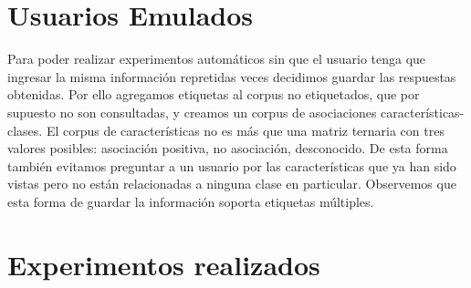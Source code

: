 \section{Usuarios Emulados}

Para poder realizar experimentos automáticos sin que el usuario tenga que ingresar la misma información repretidas veces decidimos guardar las respuestas obtenidas. Por ello agregamos etiquetas al corpus no etiquetados, que por supuesto no son consultadas, y creamos un corpus de asociaciones características-clases.
El corpus de características no es más que una matriz ternaria con tres valores posibles: asociación positiva, no asociación, desconocido. De esta forma también evitamos preguntar a un usuario por las características que ya han sido vistas pero no están relacionadas a ninguna clase en particular. Observemos que esta forma de guardar la información soporta etiquetas múltiples.

\section{Experimentos realizados}



